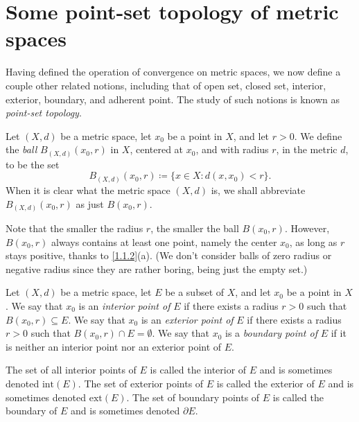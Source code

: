 \section{Some point-set topology of metric spaces}\label{sec 1.2}

\begin{note}
  Having defined the operation of convergence on metric spaces, we now define a couple other related notions, including that of open set, closed set, interior, exterior, boundary, and adherent point.
  The study of such notions is known as \emph{point-set topology}.
\end{note}

\begin{definition}[Balls]\label{1.2.1}
  Let \((X, d)\) be a metric space, let \(x_0\) be a point in \(X\), and let \(r > 0\).
  We define the \emph{ball} \(B_{(X, d)}(x_0, r)\) in \(X\), centered at \(x_0\), and with radius \(r\), in the metric \(d\), to be the set
  \[
    B_{(X, d)}(x_0, r) \coloneqq \{x \in X : d(x, x_0) < r\}.
  \]
  When it is clear what the metric space \((X, d)\) is, we shall abbreviate \(B_{(X, d)}(x_0, r)\) as just \(B(x_0, r)\).
\end{definition}

\setcounter{theorem}{3}
\begin{remark}\label{1.2.4}
  Note that the smaller the radius \(r\), the smaller the ball \(B(x_0 , r)\).
  However, \(B(x_0 , r)\) always contains at least one point, namely the center \(x_0\), as long as \(r\) stays positive, thanks to \cref{1.1.2}(a).
  (We don't consider balls of zero radius or negative radius since they are rather boring, being just the empty set.)
\end{remark}

\begin{definition}\label{1.2.5}
  Let \((X, d)\) be a metric space, let \(E\) be a subset of \(X\), and let \(x_0\) be a point in \(X\).
  We say that \(x_0\) is an \emph{interior point of} \(E\) if there exists a radius \(r > 0\) such that \(B(x_0, r) \subseteq E\).
  We say that \(x_0\) is an \emph{exterior point of} \(E\) if there exists a radius \(r > 0\) such that \(B(x_0, r) \cap E = \emptyset\).
  We say that \(x_0\) is a \emph{boundary point of} \(E\) if it is neither an interior point nor an exterior point of \(E\).
\end{definition}

\begin{note}
  The set of all interior points of \(E\) is called the interior of \(E\) and is sometimes denoted \(\text{int}(E)\).
  The set of exterior points of \(E\) is called the exterior of \(E\) and is sometimes denoted \(\text{ext}(E)\).
  The set of boundary points of \(E\) is called the boundary of \(E\) and is sometimes denoted \(\partial E\).
\end{note}

